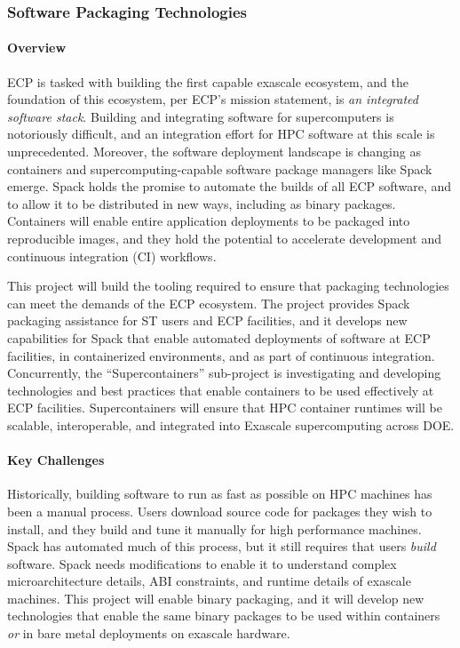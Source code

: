 \subsubsection{ Software Packaging Technologies} \label{subsubsect:sw-packaging}


\paragraph{Overview}

ECP is tasked with building the first capable exascale ecosystem, and the
foundation of this ecosystem, per ECP's mission statement, is {\it an
integrated software stack}.  Building and integrating software for
supercomputers is notoriously difficult, and an integration effort for
HPC software at this scale is unprecedented.  Moreover, the software
deployment landscape is changing as containers and supercomputing-capable
software package managers like Spack emerge.  Spack holds the promise to
automate the builds of all ECP software, and to allow it to be
distributed in new ways, including as binary packages.  Containers will
enable entire application deployments to be packaged into reproducible
images, and they hold the potential to accelerate development and
continuous integration (CI) workflows.

This project will build the tooling required to ensure that packaging
technologies can meet the demands of the ECP ecosystem.  The project
provides Spack packaging assistance for ST users and ECP facilities, and
it develops new capabilities for Spack that enable automated deployments
of software at ECP facilities, in containerized environments, and as part
of continuous integration.  Concurrently, the ``Supercontainers''
sub-project is investigating and developing technologies and best
practices that enable containers to be used effectively at ECP
facilities. Supercontainers will ensure that HPC container runtimes will
be scalable, interoperable, and integrated into Exascale supercomputing
across DOE.


\paragraph{Key Challenges}

Historically, building software to run as fast as possible on HPC
machines has been a manual process.  Users download source code for
packages they wish to install, and they build and tune it manually for
high performance machines. Spack has automated much of this process, but
it still requires that users {\it build} software.  Spack needs
modifications to enable it to understand complex microarchitecture
details, ABI constraints, and runtime details of exascale machines.  This
project will enable binary packaging, and it will develop new
technologies that enable the same binary packages to be used within
containers {\it or} in bare metal deployments on exascale hardware.

